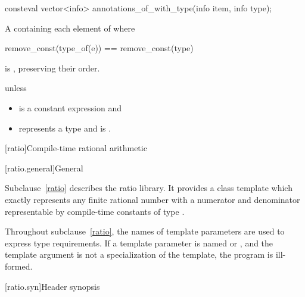 %
\begin{itemdecl}
consteval vector<info> annotations_of_with_type(info item, info type);
\end{itemdecl}

\begin{itemdescr}
\pnum
\returns
A  containing each element  of 
where
\begin{codeblock}
remove_const(type_of(e)) == remove_const(type)
\end{codeblock}
is , preserving their order.

\pnum
\throws
{} unless
\begin{itemize}
\item
   is a constant expression and
\item
   represents a type and
   is .
\end{itemize}
\end{itemdescr}

[ratio]{Compile-time rational arithmetic}

[ratio.general]{General}

\pnum
{}%
Subclause~\ref{ratio} describes the ratio library. It provides a class template
 which exactly represents any finite rational number with a
numerator and denominator representable by compile-time constants of type
.

\pnum
Throughout subclause~\ref{ratio}, the names of template parameters are used to express
type requirements. If a template parameter is named  or ,
and the template argument is not a specialization of the  template,
the program is ill-formed.

[ratio.syn]{Header  synopsis}


